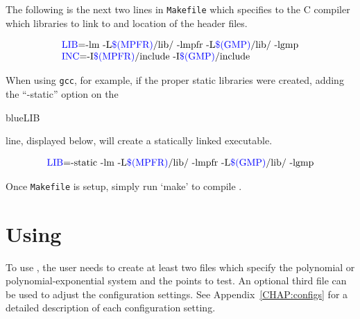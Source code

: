 \documentclass[11pt]{report}
\begin{document}
The following is the next two lines in {\tt Makefile}
which specifies to the C compiler which libraries to link to
and location of the header files.

$$\begin{array}{l}
\hbox{\begin{color}{blue}LIB\end{color}=-lm -L\begin{color}{blue}\$(MPFR)\end{color}/lib/ -lmpfr -L\begin{color}{blue}\$(GMP)\end{color}/lib/ -lgmp} \\
\hbox{\begin{color}{blue}INC\end{color}=-I\begin{color}{blue}\$(MPFR)\end{color}/include -I\begin{color}{blue}\$(GMP)\end{color}/include}
\end{array}$$

When using {\tt gcc}, for example, if the proper static libraries were created,
adding the ``-static'' option on the \begin{color}{blue}LIB\end{color} line, displayed below,
will create a statically linked executable.

$$\begin{array}{l}
\hbox{\begin{color}{blue}LIB\end{color}=-static -lm -L\begin{color}{blue}\$(MPFR)\end{color}/lib/ -lmpfr -L\begin{color}{blue}\$(GMP)\end{color}/lib/ -lgmp}
\end{array}$$

Once {\tt Makefile} is setup, simply run `make' to compile \blueharvest.

\section{Using \blueharvest}\label{CHAP:use}

To use \blueharvest, the user needs to create at least two files which specify
the polynomial or polynomial-exponential system and the points to test.  
An optional third file can be used to adjust the configuration settings.  
See Appendix~\ref{CHAP:configs} for a detailed description of each configuration setting.
\end{document}
